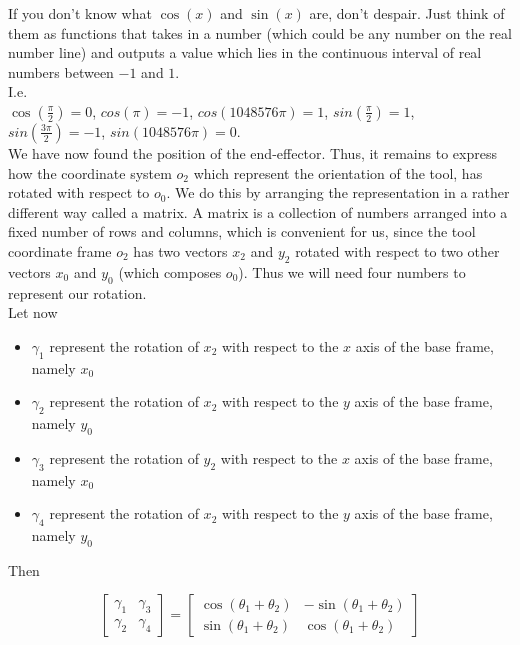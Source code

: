 	If you don't know what $\cos(x)$ and $\sin(x)$ are, don't despair. Just think of them as functions that takes in a number (which could be any number on the real number line) and outputs a value which lies in the continuous interval of real numbers between $-1$ and $1$.\\
	I.e.\\ $\cos(\frac{\pi}{2}) = 0$, $cos(\pi) = -1$, $cos(1048576\pi) = 1$, $sin(\frac{\pi}{2}) = 1$, $sin(\frac{3\pi}{2}) = -1$, $sin(1048576\pi) = 0$.\\

	We have now found the position of the end-effector. Thus, it remains to express how the coordinate system $o_2$ which represent the orientation of the tool, has rotated with respect to $o_0$.
	We do this by arranging the representation in a rather different way called a matrix. A matrix is a collection of numbers arranged into a fixed number of rows and columns, which is convenient for us, since the tool coordinate frame $o_2$ has two vectors $x_{2}$ and $y_{2}$ rotated with respect to two other vectors $x_{0}$ and $y_{0}$ (which composes $o_0$). Thus we will need four numbers to represent our rotation.\\


	Let now

	\begin{itemize}

		\item $\gamma_1$ represent the rotation of $x_{2}$ with respect to the $x$ axis of the base frame, namely $x_{0}$
		\item $\gamma_2$ represent the rotation of $x_{2}$ with respect to the $y$ axis of the base frame, namely $y_{0}$
		\item $\gamma_3$ represent the rotation of $y_{2}$ with respect to the $x$ axis of the base frame, namely $x_{0}$
		\item $\gamma_4$ represent the rotation of $x_{2}$ with respect to the $y$ axis of the base frame, namely $y_{0}$

	\end{itemize}

	Then


	\begin{equation} \label{eq:orientation}
		\begin{bmatrix}
			\gamma_1 & \gamma_3 \\
			\gamma_2 & \gamma_4
		\end{bmatrix}
		=
		\begin{bmatrix}
			\cos(\theta_{1} + \theta_{2}) & -\sin(\theta_{1} + \theta_{2}) \\
			\sin(\theta_{1} + \theta_{2}) & \cos(\theta_{1} + \theta_{2})
		\end{bmatrix}
	\end{equation}

